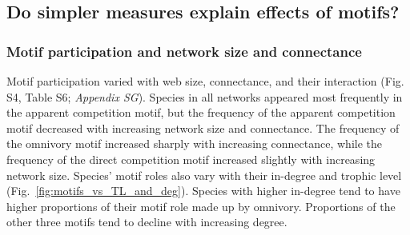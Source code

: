 \documentclass[12pt]{article}
\begin{document}
\begin{spacing}{2.0}
    
    \clearpage
    
    \subsection*{Do simpler measures explain effects of motifs?}

        \subsubsection*{Motif participation and network size and connectance}

        Motif participation varied with web size, connectance, and their interaction (Fig. S4, Table S6; \emph{Appendix SG}).
        Species in all networks appeared most frequently in the apparent competition motif, but the frequency of the apparent competition motif decreased with increasing network size and connectance.
        The frequency of the omnivory motif increased sharply with increasing connectance, while the frequency of the direct competition motif increased slightly with increasing network size. 
        Species' motif roles also vary with their in-degree and trophic level (Fig.~\ref{fig:motifs_vs_TL_and_deg}).
        Species with higher in-degree tend to have higher proportions of their motif role made up by omnivory. Proportions of the other three motifs tend to decline with increasing degree.
        

\end{spacing}
\end{document}
